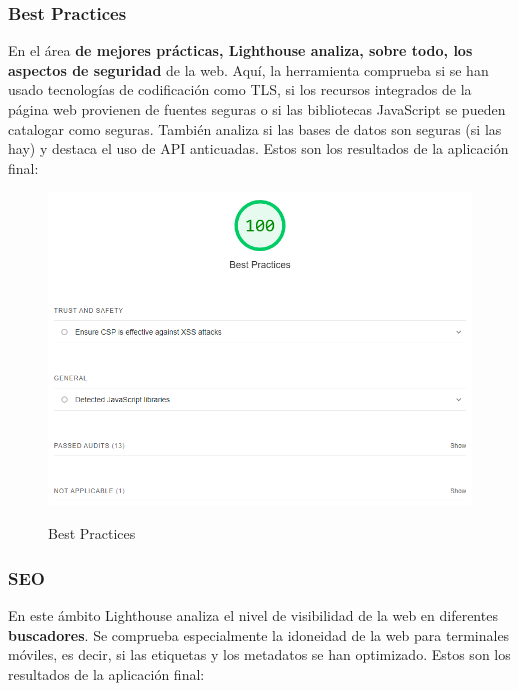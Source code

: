 \documentclass[12pt,twoside,titlepage]{report}
\begin{document}
\subsubsection{Best Practices}

En el área \textbf{de mejores prácticas, Lighthouse analiza, sobre todo, los aspectos de seguridad} de la web. Aquí, la herramienta comprueba si se han usado tecnologías de codificación como TLS, si los recursos integrados de la página web provienen de fuentes seguras o si las bibliotecas JavaScript se pueden catalogar como seguras. También analiza si las bases de datos son seguras (si las hay) y destaca el uso de API anticuadas. Estos son los resultados de la aplicación final:

\begin{figure}[H]
    \centering
    \includegraphics[scale=0.6]{Lighthouse/BestPractices}
    \label{fig:Lighthouse_bestpractices}
    \caption{Best Practices}
\end{figure}

\subsubsection{SEO}

En este ámbito Lighthouse analiza el nivel de visibilidad de la web en diferentes \textbf{buscadores}. Se comprueba especialmente la idoneidad de la web para terminales móviles, es decir, si las etiquetas y los metadatos se han optimizado. Estos son los resultados de la aplicación final:
\end{document}
